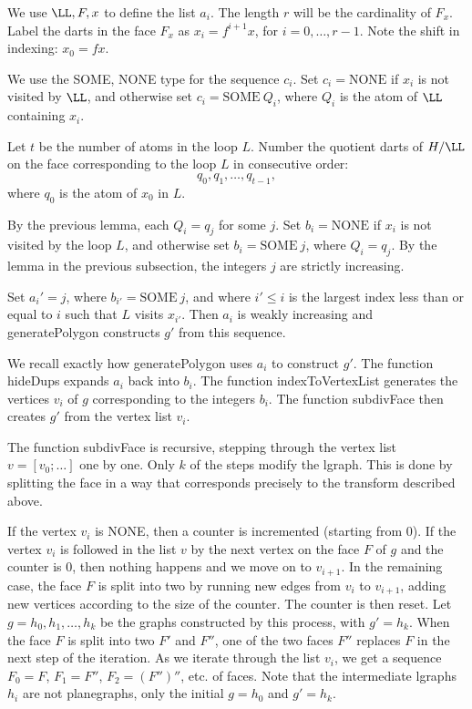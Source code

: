 We use $\LL,F,x$ to define the list $a_i$.  The length $r$ will be the
cardinality of $F_x$.  Label the darts in the face $F_x$ as $x_i =
f^{i+1} x$, for $i=0,\ldots,r-1$.  Note the shift in indexing: $x_0 =
f x$.

We use the SOME, NONE type for the sequence $c_i$.
Set $c_i = \text{NONE}$
if $x_i$ is not visited by  $\LL$, and otherwise set 
$c_i = \text{SOME}~Q_i$,
where $Q_i$ is the atom of $\LL$ containing $x_i$.  

Let $t$ be the number of atoms in the loop $L$.  Number the quotient
darts of $H/\LL$ on the face corresponding to the loop $L$ in
consecutive order:
\[
q_0,q_1,\ldots,q_{t-1},
\]
where $q_0$ is the atom of $x_0$ in $L$.

By the previous lemma, each $Q_i = q_j$ for some $j$.
Set $b_i = \text{NONE}$
if $x_i$ is not visited by the loop $L$, and otherwise set 
$b_i = \text{SOME}~j$,
where $Q_i = q_j$.
By the  lemma in the previous subsection, 
the integers $j$ are strictly increasing.

Set $a_i' = j$, where $b_{i'} = \text{SOME}~j$, and
where $i'\le i$ is the largest index less than or equal to $i$ such
that $L$ visits $x_{i'}$.  Then $a_i$ is weakly increasing and
generatePolygon constructs $g'$ from this sequence.

We recall exactly how generatePolygon uses $a_i$ to construct
$g'$.  The function hideDups expands $a_i$ back into $b_i$.
The function indexToVertexList generates the
vertices $v_i$ of $g$ corresponding to the integers $b_i$.
The function subdivFace then creates $g'$ from the vertex list $v_i$.

The function subdivFace is recursive, stepping through the vertex list
$v=[v_0;\ldots]$ one by one.  Only $k$ of the steps modify the lgraph.
This is done by splitting the face in a way that corresponds precisely
to the transform described above.

If the vertex $v_i$ is NONE, then a counter is incremented (starting
from 0).  If the vertex $v_i$ is followed in the list $v$ by the next
vertex on the face $F$ of $g$ and the counter is $0$, then nothing
happens and we move on to $v_{i+1}$.  In the remaining case, the face
$F$ is split into two by running new edges from $v_i$ to $v_{i+1}$,
adding new vertices according to the size of the counter.  The counter
is then reset.  Let $g=h_0,h_1,\ldots,h_k$ be the graphs constructed
by this process, with $g' = h_k$.  When the face $F$ is split into two
$F'$ and $F''$, one of the two faces $F''$ replaces $F$ in the next
step of the iteration.  As we iterate through the list $v_i$, we get a
sequence $F_0=F$, $F_1 =F''$, $F_2 = (F'')''$, etc.  of faces.  Note
that the intermediate lgraphs $h_i$ are not planegraphs, only the
initial $g=h_0$ and $g'=h_k$.

